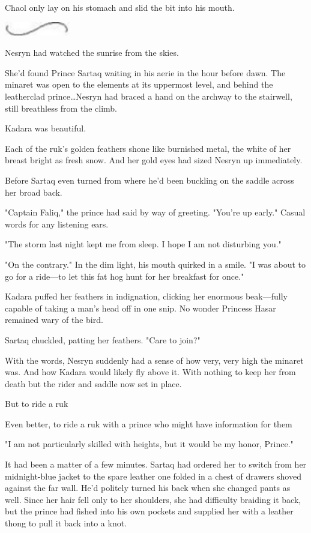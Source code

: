 Chaol only lay on his stomach and slid the bit into his mouth.

\begin{center}
	\includegraphics[width=1.12in,height=0.24in]{images/seperator}
\end{center}

Nesryn had watched the sunrise from the skies.

She'd found Prince Sartaq waiting in his aerie in the hour before dawn.
The minaret was open to the elements at its uppermost level, and behind the leatherclad prince\ldots Nesryn had braced a hand on the archway to the stairwell, still breathless from the climb.

Kadara was beautiful.

Each of the ruk's golden feathers shone like burnished metal, the white of her breast bright as fresh snow.
And her gold eyes had sized Nesryn up immediately.

Before Sartaq even turned from where he'd been buckling on the saddle across her broad back.

"Captain Faliq," the prince had said by way of greeting.
"You're up early."
Casual words for any listening ears.

"The storm last night kept me from sleep.
I hope I am not disturbing you."

"On the contrary."
In the dim light, his mouth quirked in a smile.
"I was about to go for a ride---to let this fat hog hunt for her breakfast for once."

Kadara puffed her feathers in indignation, clicking her enormous beak---fully capable of taking a man's head off in one snip.
No wonder Princess Hasar remained wary of the bird.

Sartaq chuckled, patting her feathers.
"Care to join?"

With the words, Nesryn suddenly had a sense of how very, very high the minaret was.
And how Kadara would likely fly above it.
With nothing to keep her from death but the rider and saddle now set in place.

But to ride a ruk 

Even better, to ride a ruk with a prince who might have information for them 

"I am not particularly skilled with heights, but it would be my honor, Prince."

It had been a matter of a few minutes.
Sartaq had ordered her to switch from her midnight-blue jacket to the spare leather one folded in a chest of drawers shoved against the far wall.
He'd politely turned his back when she changed pants as well.
Since her hair fell only to her shoulders, she had difficulty braiding it back, but the prince had fished into his own pockets and supplied her with a leather thong to pull it back into a knot.


